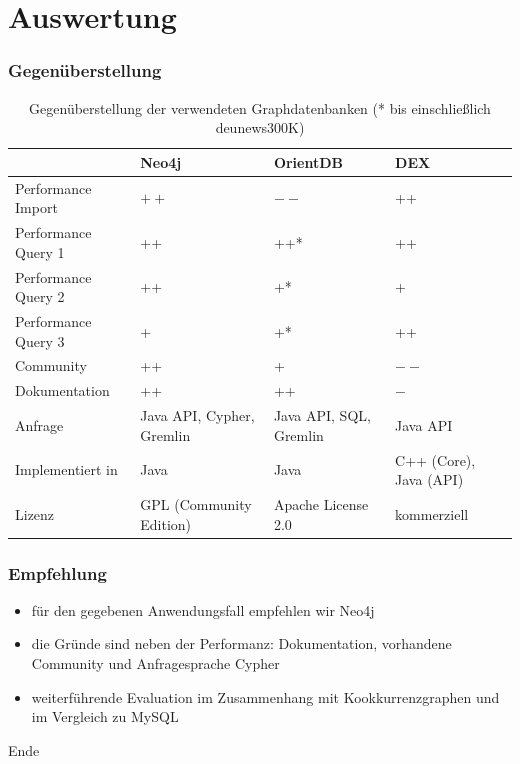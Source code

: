 \documentclass{beamer}
\begin{document}
\section{Auswertung}
\begin{frame}\frametitle{Gegenüberstellung}

	\renewcommand{\arraystretch}{1.5}
	
	\begin{table}[ht]
	\begin{tabular}{|l||p{2.5cm}|p{2.5cm}|p{2.5cm}|}
	\hline 
	 & \textbf{Neo4j} & \textbf{OrientDB} & \textbf{DEX} \\ 
	\hline
	Performance Import & $++$ & $--$ & ++ \\ 
	\hline 
	Performance Query 1 & ++ & ++* & ++ \\ 
	\hline 
	Performance Query 2 & ++ & +* & + \\ 
	\hline 
	Performance Query 3 & + & +* & ++ \\ 
	\hline
	Community & ++ & + & $--$ \\ 
	\hline 
	Dokumentation & ++ & ++ & $-$ \\
	\hline 
	Anfrage & Java API, Cypher, Gremlin & Java API, SQL, Gremlin & Java API \\
	\hline
	Implementiert in & Java & Java & C++ (Core), Java (API) \\
	\hline 
	Lizenz & GPL (Community Edition) & Apache License 2.0 & kommerziell	 \\ 
	\hline 
	\end{tabular}
	\caption{Gegenüberstellung der verwendeten Graphdatenbanken (* bis einschließlich deu\textunderscore news\textunderscore 300K)}
	\label{tab:compare}
	\end{table}

\normalfont

\end{frame}

\begin{frame}\frametitle{Empfehlung}
	\begin{itemize}
		\item für den gegebenen Anwendungsfall empfehlen wir Neo4j
		\item die Gründe sind neben der Performanz: Dokumentation, vorhandene Community und Anfragesprache Cypher
		\item weiterführende Evaluation im Zusammenhang mit Kookkurrenzgraphen und im Vergleich zu MySQL
	\end{itemize} 
\end{frame}

\begin{frame}
	\begin{center}
		\begin{Huge}
			Ende
		\end{Huge}
	\end{center}
\end{frame}
\end{document}
